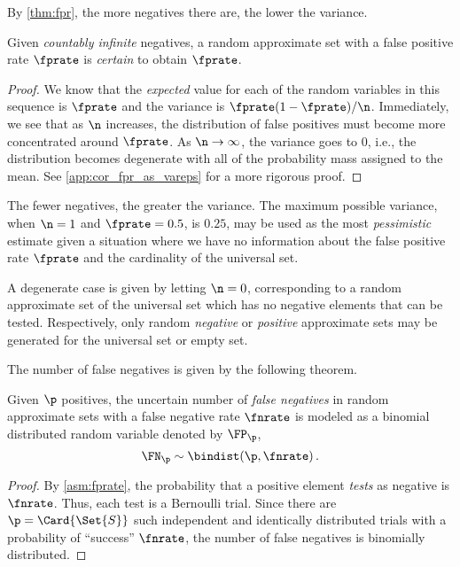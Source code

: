 \documentclass[ ../main.tex]{subfiles}
\begin{document}
By \cref{thm:fpr}, the more negatives there are, the lower the variance.
\begin{corollary}
\label{cor:fpr_as_vareps}
	Given \emph{countably infinite} negatives, a random approximate set with a false positive rate $\fprate$ is \emph{certain} to obtain $\fprate$.
\end{corollary}
\begin{proof}
We know that the \emph{expected} value for each of the random variables in this sequence is $\fprate$ and the variance is $\fprate(1-\fprate)/\n$.
Immediately, we see that as $\n$ increases, the distribution of false positives must become more concentrated around $\fprate$.
As $\n \to \infty$, the variance goes to $0$, i.e., the distribution becomes degenerate with all of the probability mass assigned to the mean. See \cref{app:cor_fpr_as_vareps} for a more rigorous proof.
\end{proof}

The fewer negatives, the greater the variance.
The maximum possible variance, when $\n=1$ and $\fprate = 0.5$, is $0.25$, may be used as the most \emph{pessimistic} estimate given a situation where we have no information about the false positive rate $\fprate$ and the cardinality of the universal set.

A degenerate case is given by letting $\n = 0$, corresponding to a random approximate set of the universal set which has no negative elements that can be tested.
Respectively, only random \emph{negative} or \emph{positive} approximate sets may be generated for the universal set or empty set.

The number of false negatives is given by the following theorem.
\begin{theorem}
\label{thm:fnbinom}
Given $\p$ positives, the uncertain number of \emph{false negatives} in random approximate sets with a false negative rate $\fnrate$ is modeled as a binomial distributed random variable denoted by $\FP_\p$,
\begin{equation}
	\FN_\p \sim \bindist(\p, \fnrate)\,.
\end{equation}
\end{theorem}
\begin{proof}
By \cref{asm:fprate}, the probability that a positive element \emph{tests} as negative is $\fnrate$.
Thus, each test is a Bernoulli trial.
Since there are $\p = \Card{\Set{S}}$ such independent and identically distributed trials with a probability of ``success'' $\fnrate$, the number of false negatives is binomially distributed.
\end{proof}
\end{document}
